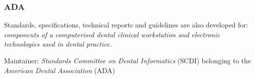 %
%
%
%
%
%
%

\subsubsection{ADA}
\label{ada_heading}

Standards, specifications, technical reports and guidelines are also developed
for: \textit{components of a computerised dental clinical workstation and
electronic technologies used in dental practice.} \cite{ada}

Maintainer: \emph{Standards Committee on Dental Informatics} (SCDI) belonging
to the \emph{American Dental Association} (ADA)
